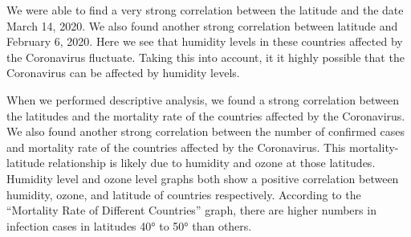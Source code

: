 \documentclass[10pt,journal,compsoc]{IEEEtran}
\begin{document}
	We were able to find a very strong correlation between the latitude and the date March 14, 2020. We also found another strong correlation between latitude and February 6, 2020. Here we see that humidity levels in these countries affected by the Coronavirus fluctuate. Taking this into account, it it highly possible that the Coronavirus can be affected by humidity levels. 

	When we performed descriptive analysis, we found a strong correlation between the latitudes and the mortality rate of the countries affected by the Coronavirus. We also found another strong correlation between the number of confirmed cases and mortality rate of the countries affected by the Coronavirus. This mortality-latitude relationship is likely due to humidity and ozone at those latitudes. Humidity level and ozone level graphs both show a positive correlation between humidity, ozone, and latitude of countries respectively. According to the “Mortality Rate of Different Countries” graph, there are higher numbers in infection cases in latitudes 40° to 50° than others.
\end{document}
